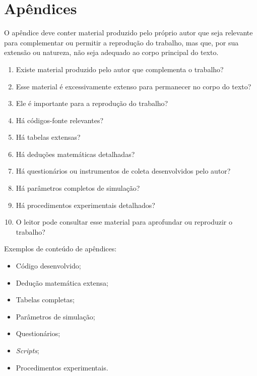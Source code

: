 \chapter{Apêndices}

O apêndice deve conter material produzido pelo próprio autor que seja
relevante para complementar ou permitir a reprodução do trabalho, mas que,
por sua extensão ou natureza, não seja adequado ao corpo principal do texto.

\begin{enumerate}
	\item Existe material produzido pelo autor que complementa o trabalho?
	\item Esse material é excessivamente extenso para permanecer no corpo do texto?
	\item Ele é importante para a reprodução do trabalho?
	\item Há códigos-fonte relevantes?
	\item Há tabelas extensas?
	\item Há deduções matemáticas detalhadas?
	\item Há questionários ou instrumentos de coleta desenvolvidos pelo autor?
	\item Há parâmetros completos de simulação?
	\item Há procedimentos experimentais detalhados?
	\item O leitor pode consultar esse material para aprofundar ou reproduzir o trabalho?
\end{enumerate}

{Exemplos de conteúdo de apêndices:}

\begin{itemize}
	\item Código desenvolvido;
	\item Dedução matemática extensa;
	\item Tabelas completas;
	\item Parâmetros de simulação;
	\item Questionários;
	\item \textit{Scripts};
	\item Procedimentos experimentais.
\end{itemize}